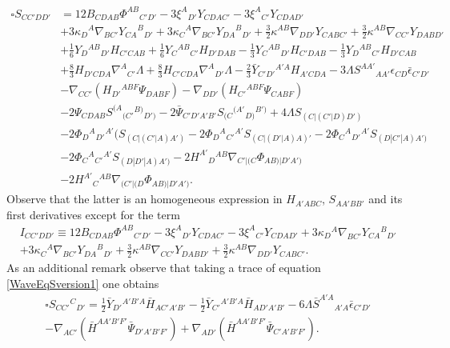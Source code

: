 \documentclass[10pt,a4paper]{article}
\theoremstyle{plain}
\begin{document}
\begin{align}\label{WaveEqSversion1}
 \square S_{CC'DD'}&= 12 B_{CDAB} \Phi^{AB}{}_{C'D'} - 3
 \xi^{A}{}_{D'} Y_{CDAC'} - 3 \xi^{A}{}_{C'} Y_{CDAD'} \nonumber\\ & +
 3 \kappa_{D}{}^{A} \nabla_{BC'}Y_{CA}{}^{B}{}_{D'} + 3
 \kappa_{C}{}^{A} \nabla_{BC'}Y_{DA}{}^{B}{}_{D'} + \tfrac{3}{2}
 \kappa^{AB} \nabla_{DD'}Y_{CABC'}+ \tfrac{3}{2} \kappa^{AB}
 \nabla_{CC'}Y_{DABD'} \nonumber\\ & + \tfrac{1}{6}
 Y_{D}{}^{AB}{}_{D'} H_{C'CAB}+ \tfrac{1}{6} Y_{C}{}^{AB}{}_{C'}
 H_{D'DAB} - \tfrac{1}{3} Y_{C}{}^{AB}{}_{D'} H_{C'DAB} - \tfrac{1}{3}
 Y_{D}{}^{AB}{}_{C'} H_{D'CAB} \nonumber\\ & + \tfrac{8}{3} H_{D'CDA}
 \nabla^{A}{}_{C'}\Lambda + \tfrac{8}{3} H_{C'CDA}
 \nabla^{A}{}_{D'}\Lambda - \tfrac{2}{3} \bar{Y}_{C'D'}{}^{A'A}
 H_{A'CDA} - 3 \Lambda S^{AA'}{}_{AA'} \epsilon_{CD}
 \bar{\epsilon}_{C'D'} \nonumber\\ & -
 \nabla_{CC'}\left(H_{D'}{}^{ABF} \Psi_{DABF}\right) -
 \nabla_{DD'}\left(H_{C'}{}^{ABF} \Psi_{CABF}\right) \nonumber\\ &- 2
 \Psi_{CDAB} S^{(A}{}_{(C'}{}^{B)}{}_{D')} - 2 \bar{\Psi}_{C'D'A'B'}
 S_{(C}{}^{(A'}{}_{D)}{}^{B')} + 4 \Lambda S_{(C|(C'|D)D')}
 \nonumber\\ & - 2 \Phi_{D}{}^{A}{}_{D'}{}^{A'} (S_{(C|(C'|A)A')}- 2
 \Phi_{D}{}^{A}{}_{C'}{}^{A'} S_{(C|(D'|A)A)'}- 2
 \Phi_{C}{}^{A}{}_{D'}{}^{A'} S_{(D|C'|A)A')}\nonumber\\ & - 2
 \Phi_{C}{}^{A}{}_{C'}{}^{A'} S_{(D|D'|A)A')} - 2 H^{A'}{}_{D}{}^{AB}
 \nabla_{C'|(C}\Phi_{AB)|D'A')} \nonumber\\ & - 2 H^{A'}{}_{C}{}^{AB}
 \nabla_{(C'|(D}\Phi_{AB)|D'A')}.
\end{align}
Observe that the latter is an homogeneous expression in $H_{A'ABC}$,
$S_{AA'BB'}$ and its first derivatives except for the term
\begin{multline*}
I_{CC'DD'} \equiv 12 B_{CDAB} \Phi^{AB}{}_{C'D'} - 3 \xi^{A}{}_{D'}
Y_{CDAC'} - 3 \xi^{A}{}_{C'} Y_{CDAD'} + 3 \kappa_{D}{}^{A}
\nabla_{BC'}Y_{CA}{}^{B}{}_{D'} \\ + 3 \kappa_{C}{}^{A}
\nabla_{BC'}Y_{DA}{}^{B}{}_{D'} + \tfrac{3}{2} \kappa^{AB}
\nabla_{CC'}Y_{DABD'} + \tfrac{3}{2} \kappa^{AB} \nabla_{DD'}Y_{CABC'}.
\end{multline*}
As an additional remark observe that taking a trace of equation
\eqref{WaveEqSversion1} one obtains
\begin{multline}
\square S_{CC'}{}^{C}{}_{D'}= \tfrac{1}{2} \bar{Y}_{D'}{}^{A'B'A}
\bar{H}_{AC'A'B'} - \tfrac{1}{2} \bar{Y}_{C'}{}^{A'B'A}
\bar{H}_{AD'A'B'} - 6 \Lambda \bar{S}^{A'A}{}_{A'A}
\bar{\epsilon}_{C'D'} \\ - \nabla_{AC'}\left(\bar{H}^{AA'B'F'}
\bar{\Psi}_{D'A'B'F'}\right) + \nabla_{AD'}\left(\bar{H}^{AA'B'F'}
\bar{\Psi}_{C'A'B'F'}\right).
\end{multline}
\end{document}
